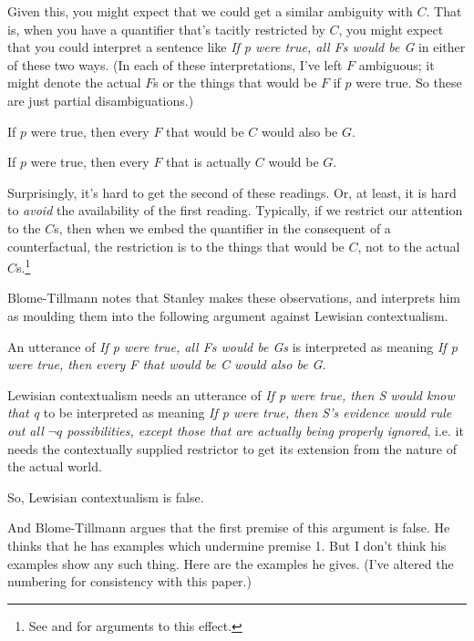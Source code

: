 \noindent Given this, you might expect that we could get a similar ambiguity with \(C\). That is, when you have a quantifier that's tacitly restricted by \(C\), you might expect that you could interpret a sentence like \textit{If p were true, all Fs would be G} in either of these two ways. (In each of these interpretations, I've left \(F\) ambiguous; it might denote the actual \(F\)s or the things that would be \(F\) if \(p\) were true. So these are just partial disambiguations.)

\begin{itemize*}
\item If \(p\) were true, then every \(F\) that would be \(C\) would also be \(G\).
\item If \(p\) were true, then every \(F\) that is actually \(C\) would be \(G\).
\end{itemize*}

\noindent Surprisingly, it's hard to get the second of these readings. Or, at least, it is hard to \textit{avoid} the availability of the first reading. Typically, if we restrict our attention to the \(C\)s, then when we embed the quantifier in the consequent of a counterfactual, the restriction is to the things that would be \(C\), not to the actual \(C\)s.\footnote{See \cite{Stanley2000-STAOQD} and \cite{Stanley2005-STAKAP} for arguments to this effect.} 

Blome-Tillmann notes that Stanley makes these observations, and interprets him as moulding them into the following argument against Lewisian contextualism.

\begin{enumerate*}
\item An utterance of \textit{If p were true, all Fs would be Gs} is interpreted as meaning \textit{If p were true, then every F that would be C would also be G}.
\item Lewisian contextualism needs an utterance of \textit{If p were true, then S would know that q} to be interpreted as meaning \textit{If p were true, then S's evidence would rule out all $\neg q$ possibilities, except those that are actually being properly ignored}, i.e. it needs the contextually supplied restrictor to get its extension from the nature of the actual world.
\item So, Lewisian contextualism is false.
\end{enumerate*}

\noindent And Blome-Tillmann argues that the first premise of this argument is false. He thinks that he has examples which undermine premise 1. But I don't think his examples show any such thing. Here are the examples he gives. (I've altered the numbering for consistency with this paper.)

